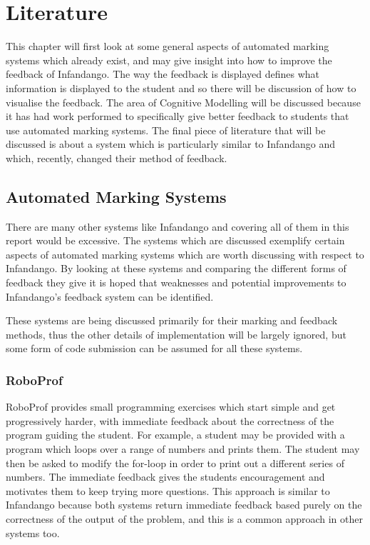 \chapter{Literature}
\label{background}
This chapter will first look at some general aspects of automated marking systems which already exist, and may give insight into how to improve the feedback of Infandango. The way the feedback is displayed defines what information is displayed to the student and so there will be discussion of how to visualise the feedback. The area of Cognitive Modelling will be discussed because it has had work performed to specifically give better feedback to students that use automated marking systems. The final piece of literature that will be discussed is about a system which is particularly similar to Infandango and which, recently, changed their method of feedback.

\section{Automated Marking Systems}
There are many other systems like Infandango and covering all of them in this report would be excessive. The systems which are discussed exemplify certain aspects of automated marking systems which are worth discussing with respect to Infandango. By looking at these systems and comparing the different forms of feedback they give it is hoped that weaknesses and potential improvements to Infandango's feedback system can be identified.

These systems are being discussed primarily for their marking and feedback methods, thus the other details of implementation will be largely ignored, but some form of code submission can be assumed for all these systems.

\subsection{RoboProf}
RoboProf\cite{roboprof} provides small programming exercises which start simple and get progressively harder, with immediate feedback about the correctness of the program guiding the student. For example, a student may be provided with a program which loops over a range of numbers and prints them. The student may then be asked to modify the for-loop in order to print out a different series of numbers. The immediate feedback gives the students encouragement and motivates them to keep trying more questions. This approach is similar to Infandango because both systems return immediate feedback based purely on the correctness of the output of the problem, and this is a common approach in other systems too\cite{webtoteach}.

